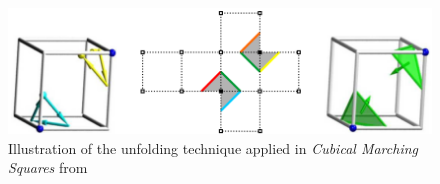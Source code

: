 \begin{figure}
\begin{center}
\includegraphics[scale=1]{Pictures/CMS.png}
\caption{Illustration of the unfolding technique applied in \emph{Cubical Marching Squares} from \cite{Ho2005}}
\label{fig:CMS}
\end{center}
\end{figure}
